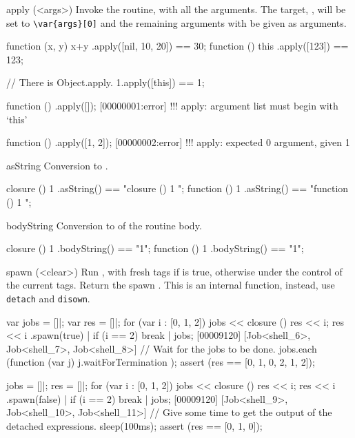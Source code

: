 \begin{urbiscriptapi}
\item[apply](<args>)%
  Invoke the routine, with all the arguments.  The target, \this, will be
  set to \lstinline|\var{args}[0]| and the remaining arguments with be given
  as arguments.
\begin{urbiassert}
function (x, y) { x+y }.apply([nil, 10, 20]) == 30;
function () { this }.apply([123]) == 123;

// There is Object.apply.
1.apply([this]) == 1;
\end{urbiassert}
\begin{urbiscript}
function () {}.apply([]);
[00000001:error] !!! apply: argument list must begin with `this'

function () {}.apply([1, 2]);
[00000002:error] !!! apply: expected 0 argument, given 1
\end{urbiscript}


\item[asString]
  Conversion to .
\begin{urbiassert}
closure  () { 1 }.asString() == "closure () { 1 }";
function () { 1 }.asString() == "function () { 1 }";
\end{urbiassert}


\item[bodyString]
  Conversion to  of the routine body.
\begin{urbiassert}
closure  () { 1 }.bodyString() == "1";
function () { 1 }.bodyString() == "1";
\end{urbiassert}


\item[spawn](<clear>)%
  Run \this, with fresh tags if  is true, otherwise under the
  control of the current tags.  Return the spawn .  This is
  an internal function, instead, use \lstinline|detach| and
  \lstinline|disown|.
\begin{urbiscript}
var jobs = []|;
var res = []|;
for (var i : [0, 1, 2])
{
  jobs << closure () { res << i; res << i }.spawn(true) |
  if (i == 2)
    break
}|
jobs;
[00009120] [Job<shell_6>, Job<shell_7>, Job<shell_8>]
// Wait for the jobs to be done.
jobs.each (function (var j) { j.waitForTermination });
assert (res == [0, 1, 0, 2, 1, 2]);
\end{urbiscript}

\begin{urbiscript}
jobs = []|;
res = []|;
for (var i : [0, 1, 2])
{
  jobs << closure () { res << i; res << i }.spawn(false) |
  if (i == 2)
    break
}|
jobs;
[00009120] [Job<shell_9>, Job<shell_10>, Job<shell_11>]
// Give some time to get the output of the detached expressions.
sleep(100ms);
assert (res == [0, 1, 0]);
\end{urbiscript}
\end{urbiscriptapi}

